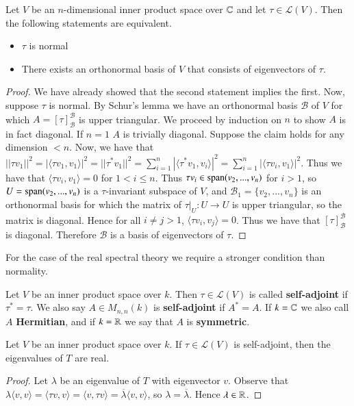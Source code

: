 \begin{theorem}
    Let $V$ be an $n$-dimensional inner product space over $\mathbb C$ and let $\tau \in \mathcal{L}(V)$. Then the following statements are equivalent. \begin{itemize}
        \item $\tau$ is normal
        \item There exists an orthonormal basis of $V$ that consists of eigenvectors of $\tau$.
    \end{itemize}
\end{theorem}
\begin{proof}
    We have already showed that the second statement implies the first. Now, suppose $\tau$ is normal. By Schur's lemma we have an orthonormal basis $\mathcal{B}$ of $V$ for which $A = [\tau]_{\mathcal{B}}^{\mathcal{B}}$ is upper triangular. We proceed by induction on $n$ to show $A$ is in fact diagonal. If $n =1$ $A$ is trivially diagonal. Suppose the claim holds for any dimension $< n$. Now, we have that $||\tau v_1||^2 = |\langle \tau v_1,v_1\rangle|^2 = ||\tau^* v_1||^2 = \sum_{i=1}^n|\langle \tau^*v_1,v_i\rangle|^2 = \sum_{i=1}^n|\langle \tau v_i,v_1\rangle|^2$. Thus we have that $\langle \tau v_i, v_1\rangle = 0$ for $1 < i \leq n$. Thus $\tau v_i \in \operatorname{span}(v_2,...,v_n)$ for $i > 1$, so $U = \operatorname{span}(v_2,...,v_n)$ is a $\tau$-invariant subspace of $V$, and $\mathcal{B}_1 = \{v_2,...,v_n\}$ is an orthonormal basis for which the matrix of $\tau\vert_U:U\rightarrow U$ is upper triangular, so the matrix is diagonal. Hence for all $i\neq j > 1$, $\langle \tau v_i,v_j \rangle = 0$. Thus we have that $[\tau]_{\mathcal{B}}^{\mathcal{B}}$ is diagonal. Therefore $\mathcal{B}$ is a basis of eigenvectors of $\tau$.
\end{proof}

For the case of the real spectral theory we require a stronger condition than normality.

\begin{definition}
    Let $V$ be an inner product space over $k$. Then $\tau \in \mathcal{L}(V)$ is called \textbf{self-adjoint} if $\tau^* = \tau$. We also say $A \in M_{n,n}(k)$ is \textbf{self-adjoint} if $A^* = A$. If $k = \mathbb C$ we also call $A$ \textbf{Hermitian}, and if $k = \mathbb R$ we say that $A$ is \textbf{symmetric}.
\end{definition}

\begin{theorem}
    Let $V$ be an inner product space over $k$. If $\tau \in \mathcal{L}(V)$ is self-adjoint, then the eigenvalues of $T$ are real.
\end{theorem}
\begin{proof}
    Let $\lambda$ be an eigenvalue of $T$ with eigenvector $v$. Observe that $\lambda\langle v,v\rangle = \langle \tau v,v\rangle = \langle v,\tau v\rangle = \overline{\lambda}\langle v,v\rangle$, so $\lambda = \overline{\lambda}$. Hence $\lambda \in \mathbb R$.
\end{proof}

